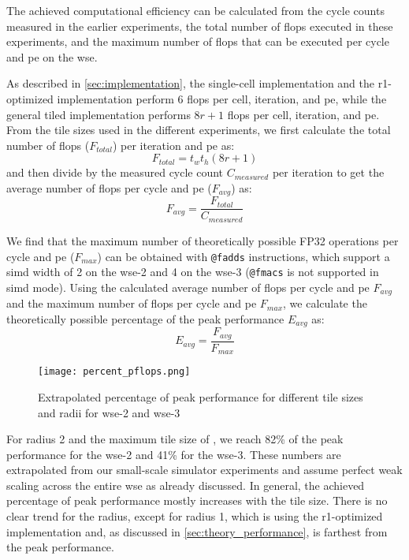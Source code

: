 The achieved computational efficiency can be calculated from the cycle counts measured in the earlier experiments, the total number of \acp{flop} executed in these experiments, and the maximum number of \acp{flop} that can be executed per cycle and \ac{pe} on the \ac{wse}.

As described in \autoref{sec:implementation}, the single-cell implementation and the r1-optimized implementation perform \num{6} \acp{flop} per cell, iteration, and \ac{pe}, while the general tiled implementation performs $8r+1$ \acp{flop} per cell, iteration, and \ac{pe}. From the tile sizes used in the different experiments, we first calculate the total number of \acp{flop} ($F_{total}$) per iteration and \ac{pe} as:
\begin{equation}
    F_{total} = t_w t_h (8r+1)
\end{equation}
and then divide by the measured cycle count $C_{measured}$ per iteration to get the average number of \acp{flop} per cycle and \ac{pe} ($F_{avg}$) as:
\begin{equation}
    F_{avg} = \frac{F_{total}}{C_{measured}}
\end{equation}

We find that the maximum number of theoretically possible FP32 operations per cycle and \ac{pe} ($F_{max}$) can be obtained with \texttt{@fadds} instructions, which support a \ac{simd} width of 2 on the \ac{wse}-2 and 4 on the \ac{wse}-3 (\texttt{@fmacs} is not supported in \ac{simd} mode). Using the calculated average number of \acp{flop} per cycle and \ac{pe} $F_{avg}$ and the maximum number of \acp{flop} per cycle and \ac{pe} $F_{max}$, we calculate the theoretically possible percentage of the peak performance $E_{avg}$ as:
\begin{equation}
    E_{avg} = \frac{F_{avg}}{F_{max}}
\end{equation}

\begin{figure}[h]
    \centering
    \texttt{[image: percent\_pflops.png]}
    \caption{Extrapolated percentage of peak performance for different tile sizes and radii for \ac{wse}-2 and \ac{wse}-3}
    \label{fig:percent_pflops}
\end{figure}

For radius 2 and the maximum tile size of , we reach \num{82}\% of the peak performance for the \ac{wse}-2 and \num{41}\% for the \ac{wse}-3.
These numbers are extrapolated from our small-scale simulator experiments and assume perfect weak scaling across the entire \ac{wse} as already discussed. 
In general, the achieved percentage of peak performance mostly increases with the tile size. There is no clear trend for the radius, except for radius 1, which is using the r1-optimized implementation and, as discussed in \autoref{sec:theory_performance}, is farthest from the peak performance.

